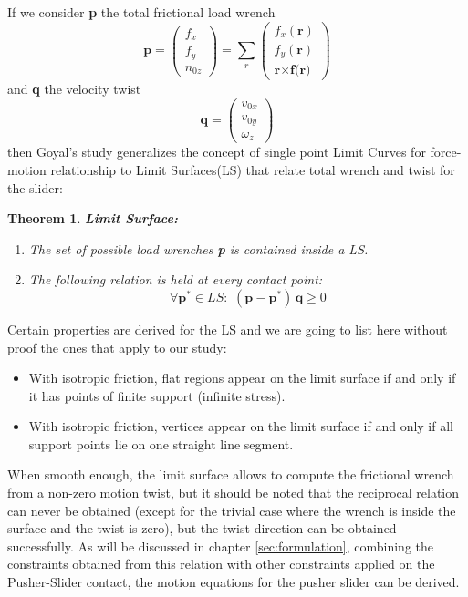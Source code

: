 \documentclass[12,twoside]{TFG-GM}
\newtheorem{theorem}{Theorem}[section]
\theoremstyle{definition}
\theoremstyle{remark}
\begin{document}
If we consider \textbf{p} the total frictional load wrench
$$ \textbf{p} =
  \begin{pmatrix}
    f_x \\
    f_y \\
    n_{0z}
  \end{pmatrix} = \sum_r \begin{pmatrix}
    f_x(\textbf{r}) \\
    f_y(\textbf{r})\\
    \textbf{r} \times \textbf{f(r)}
  \end{pmatrix}   $$
and \textbf{q} the velocity twist
$$ \textbf{q} =
  \begin{pmatrix}
  v_{0x} \\
  v_{0y} \\
  \omega_z
  \end{pmatrix}
$$
then Goyal's study generalizes the concept of single point Limit Curves for force-motion relationship to Limit Surfaces(LS) that relate total wrench and twist for the slider:
\begin{theorem} \textbf{Limit Surface:}


\begin{enumerate}
\item The set of possible load wrenches \textbf{p} is contained inside a LS.
\item The following relation is held at every contact point:
\begin{equation}
 \forall \textbf{p}^* \in LS: \,\, (\textbf{p} - \textbf{p}^*)\, \textbf{q} \geq 0 
\end{equation}
\end{enumerate}
\end{theorem}

Certain properties are derived for the LS and we are going to list here without proof the ones that apply to our study:
\begin{itemize}
\item With isotropic friction, flat regions appear on the limit surface if
and only if it has points of finite support (infinite stress).
\item With isotropic friction, vertices appear on the limit surface if and
only if all support points lie on one straight line segment.
\end{itemize}

When smooth enough, the limit surface allows to compute the frictional wrench from a non-zero motion twist, but it should be noted that the reciprocal relation can never be obtained (except for the trivial case where the wrench is inside the surface and the twist is zero), but the twist direction can be obtained successfully. As will be discussed in chapter \ref{sec:formulation}, combining the constraints obtained from this relation with other constraints applied on the Pusher-Slider contact, the motion equations for the pusher slider can be derived.
\end{document}
